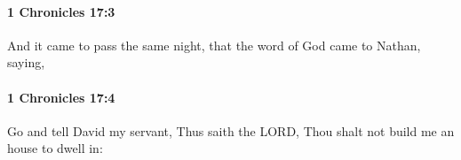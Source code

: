 		\paragraph{1 Chronicles 17:3} %
			\label{1CHRONICLES-17-3}

			And it came to pass the same night, that the word of God came to Nathan, saying,


		\paragraph{1 Chronicles 17:4} %
			\label{1CHRONICLES-17-4}

			Go and tell David my servant, Thus saith the LORD, Thou shalt not build me an house to dwell in:


